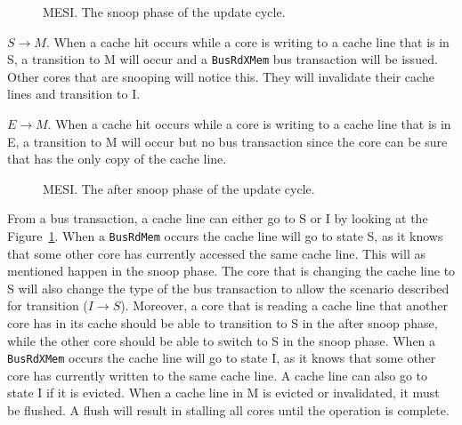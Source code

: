 \begin{figure}[ht]
    \centering
    \caption{MESI. The snoop phase of the update cycle.}
    \label{fig:mesi_snoop}
\end{figure}


$S \to M$.
When a cache hit occurs while a core is writing to a cache line that is in S, a transition to M will occur and a \texttt{BusRdXMem} bus transaction will be issued.
Other cores that are snooping will notice this.
They will invalidate their cache lines and transition to I.


$E \to M$.
When a cache hit occurs while a core is writing to a cache line that is in E, a
transition to M will occur but no bus transaction since the core can be sure that
has the only copy of the cache line.



\begin{figure}[ht]
    \centering
    \caption{MESI. The after snoop phase of the update cycle.}
    \label{fig:mesi_after_snoop}
\end{figure}

From a bus transaction, a cache line can either go to S or I by looking at the Figure~\ref{fig:mesi_snoop}.
When a \texttt{BusRdMem} occurs the cache line will go to state S, as it knows that some other core has currently accessed the same cache line.
This will as mentioned happen in the snoop phase.
The core that is changing the cache line to S will also change the type of the bus transaction to allow the scenario described for transition ($I \to S$).
Moreover, a core that is reading a cache line that another core has in its cache should be able to transition to S in the after snoop phase, while the other core should be able to switch to S in the snoop phase.
When a \texttt{BusRdXMem} occurs the cache line will go to state I, as it knows that some other core has currently written to the same cache line.
A cache line can also go to state I if it is evicted.
When a cache line in M is evicted or invalidated, it must be flushed.
A flush will result in stalling all cores until the operation is complete.

